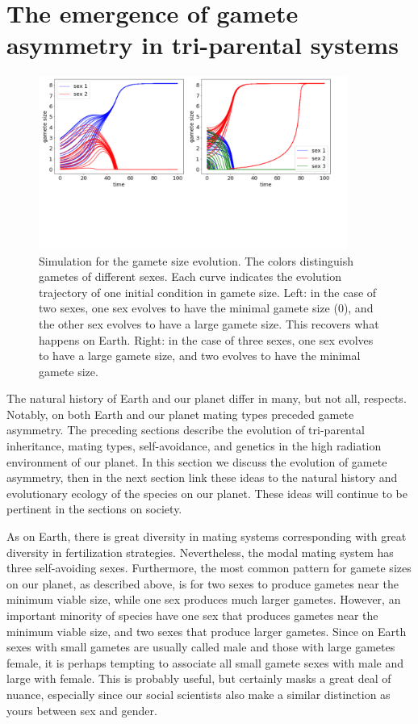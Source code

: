 \documentclass{report}
\begin{document}
\section*{The emergence of gamete asymmetry in tri-parental systems}
\begin{figure}[htb!]
    \centering
    \includegraphics[width = 0.9\textwidth]{vickysFigs/2panels}
    \caption{Simulation for the gamete size evolution. The colors distinguish gametes of different sexes. Each curve indicates the evolution trajectory of one initial condition in gamete size. Left: in the case of two sexes, one sex evolves to have the minimal gamete size ($0$), and the other sex evolves to have a large gamete size. This recovers what happens on Earth. Right: in the case of three sexes, one sex evolves to have a large gamete size, and two evolves to have the minimal gamete size.}
    \label{fig:gameteSize2Panel}
\end{figure}
The natural history of Earth and our planet differ in many, but not all, respects. Notably, on both Earth and our planet mating types preceded gamete asymmetry. The preceding sections describe the evolution of tri-parental inheritance, mating types, self-avoidance, and genetics in the high radiation environment of our planet. In this section we discuss the evolution of gamete asymmetry, then in the next section link these ideas to the natural history and evolutionary ecology of the species on our planet. These ideas will continue to be pertinent in the sections on society.

As on Earth, there is great diversity in mating systems corresponding with great diversity in fertilization strategies. Nevertheless, the modal mating system has three self-avoiding sexes. Furthermore, the most common pattern for gamete sizes on our planet, as described above, is for two sexes to produce gametes near the minimum viable size, while one sex produces much larger gametes. However, an important minority of species have one sex that produces gametes near the minimum viable size, and two sexes that produce larger gametes. Since on Earth sexes with small gametes are usually called male and those with large gametes female, it is perhaps tempting to associate all small gamete sexes with male and large with female. This is probably useful, but certainly masks a great deal of nuance, especially since our social scientists also make a similar distinction as yours between sex and gender.
\end{document}
